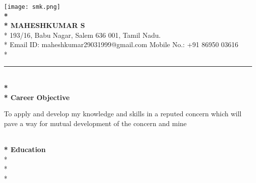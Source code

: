 \documentclass{article}
\begin{document}
\texttt{[image: smk.png]}
 \textbf{\LARGE \\* \\* MAHESHKUMAR S}
\\* \large 193/16, Babu Nagar, Salem 636 001, Tamil Nadu. 
\\* \large Email ID: maheshkumar29031999@gmail.com    
\hspace{10pt}Mobile No.: +91 86950 03616  
\\*
\hrule

\textbf{\\*  \\* Career Objective}

To apply and develop my knowledge and skills in a reputed concern which will pave a way for mutual development of the concern and mine

 \textbf{\\* Education}
\\*  
\\* 
\\* 
\end{document}
